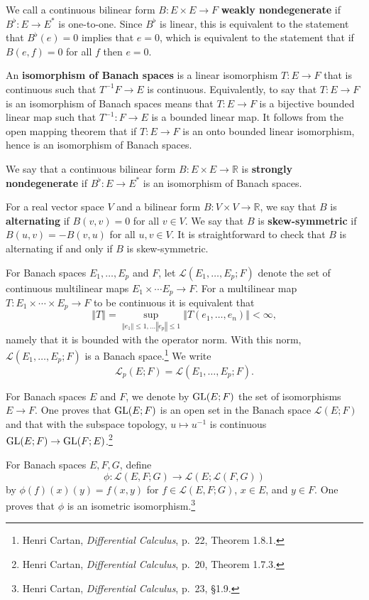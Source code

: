 \documentclass{article}
\newcommand{\GL}{\ensuremath\mathrm{GL}}
\newcommand{\norm}[1]{\left\Vert #1 \right\Vert}
\theoremstyle{definition}
\theoremstyle{definition}
\begin{document}
We call a continuous bilinear form $B:E \times E \to F$ \textbf{weakly nondegenerate} if $B^\flat:E \to E^*$
is one-to-one. Since $B^\flat$ is linear, this is equivalent to the statement that
$B^\flat(e)=0$ implies that $e=0$, which is equivalent to the statement that
 if $B(e,f)=0$ for all $f$ then $e=0$.
 
An \textbf{isomorphism of Banach spaces} is a linear isomorphism $T:E \to F$ that is continuous such that
$T^{-1}F \to E$ is continuous. Equivalently, to say that $T:E \to F$ is an isomorphism of Banach spaces
means that $T:E \to F$ is a bijective bounded linear map such that $T^{-1}:F \to E$ is a bounded linear map.
It follows from the open mapping theorem that if $T:E \to F$ is an onto bounded linear isomorphism, hence is an isomorphism of Banach spaces.

 We say that a continuous bilinear form $B:E \times E \to \mathbb{R}$ is \textbf{strongly nondegenerate} if $B^\flat:E \to E^*$ is an isomorphism of Banach spaces. 

For a real vector space $V$ and a bilinear form $B:V \times V \to \mathbb{R}$, we say that
$B$ is \textbf{alternating} if $B(v,v)=0$ for all $v \in V$. We say that $B$ is \textbf{skew-symmetric} if 
$B(u,v)=-B(v,u)$ for all $u,v \in V$. It is straightforward to check that $B$ is alternating if and only if $B$ is skew-symmetric.


For Banach spaces $E_1,\ldots,E_p$ and $F$, let
$\mathscr{L}(E_1,\ldots,E_p;F)$ denote the set of continuous multilinear maps
$E_1 \times \cdots E_p \to F$. For a multilinear map $T:E_1 \times \cdots \times E_p \to F$ to be continuous it is equivalent that
\[
\norm{T} = \sup_{\norm{e_1} \leq 1, \ldots \norm{e_p} \leq 1} \norm{T(e_1,\ldots,e_n)}
< \infty,
\]
namely that it is bounded with the operator norm. 
With this norm, $\mathscr{L}(E_1,\ldots,E_p;F)$ is a Banach space.\footnote{Henri Cartan, {\em Differential Calculus}, p.~22, Theorem 1.8.1.} 
We write
\[
\mathscr{L}_p(E;F) = \mathscr{L}(E_1,\ldots,E_p;F).
\]


For Banach spaces $E$ and $F$,
we denote by $\GL(E;F)$ the set of isomorphisms $E \to F$. One proves that $\GL(E;F)$ is an open set in the Banach space
$\mathscr{L}(E;F)$ and that with the subspace topology, $u \mapsto u^{-1}$ is continuous $\GL(E;F) \to \GL(F;E)$.\footnote{Henri Cartan, {\em Differential Calculus}, p.~20, Theorem 1.7.3.}


For Banach spaces $E,F,G$, define
\[
\phi:\mathscr{L}(E,F;G) \to \mathscr{L}(E;\mathscr{L}(F,G))
\]
by $\phi(f)(x)(y) = f(x,y)$ for $f \in \mathscr{L}(E,F;G)$, $x \in E$, and $y \in F$. One proves that
$\phi$ is an isometric isomorphism.\footnote{Henri Cartan, {\em Differential Calculus}, p.~23, \S 1.9.}
\end{document}
